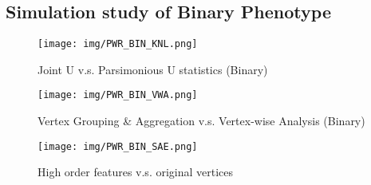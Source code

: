 \subsection{Simulation study of Binary Phenotype}

\begin{figure}[!htbp]
\label{fig:PWR_BIN_KNL}
\centering
\texttt{[image: img/PWR\_BIN\_KNL.png]}
\caption{Joint U v.s. Parsimonious U statistics (Binary)}
\end{figure}

\begin{figure}[!htbp]
\label{fig:PWR_BIN_VWA}
\centering
\texttt{[image: img/PWR\_BIN\_VWA.png]}
\caption{Vertex Grouping \& Aggregation v.s. Vertex-wise Analysis (Binary)}
\end{figure}

\begin{figure}[!htbp]
\label{fig:PWR_BIN_SAE}
\centering
\texttt{[image: img/PWR\_BIN\_SAE.png]}
\caption{High order features v.s. original vertices}
\end{figure}